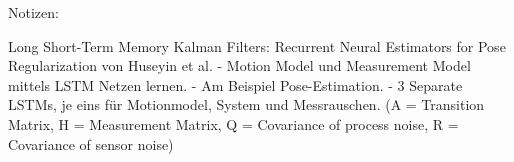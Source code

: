 

Notizen:

Long Short-Term Memory Kalman Filters: Recurrent Neural Estimators for Pose Regularization von Huseyin et al.
- Motion Model und Measurement Model mittels LSTM Netzen lernen. 
- Am Beispiel Pose-Estimation.
- 3 Separate LSTMs, je eins für Motionmodel, System und Messrauschen.
	(A = Transition Matrix, H = Measurement Matrix, Q = Covariance of process noise, R = Covariance of sensor noise)


